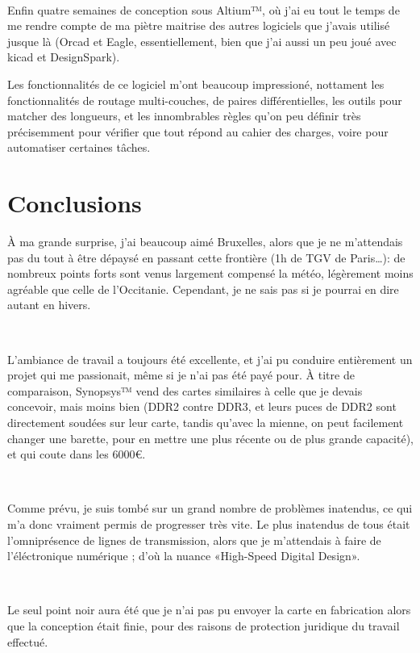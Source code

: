 \documentclass{article}
\begin{document}
~

Enfin quatre semaines de conception sous Altium™, où j’ai eu tout le temps de me rendre compte de ma piètre maitrise des autres logiciels que j’avais utilisé jusque là (Orcad et Eagle, essentiellement, bien que j’ai aussi un peu joué avec kicad et DesignSpark).

Les fonctionnalités de ce logiciel m’ont beaucoup impressioné, nottament les fonctionnalités de routage multi-couches, de paires différentielles, les outils pour matcher des longueurs, et les innombrables règles qu’on peu définir très précisemment pour vérifier que tout répond au cahier des charges, voire pour automatiser certaines tâches.

\section{Conclusions}
À ma grande surprise, j’ai beaucoup aimé Bruxelles, alors que je ne m’attendais pas du tout à être dépaysé en passant cette frontière (1h de TGV de Paris…): de nombreux points forts sont venus largement compensé la météo, légèrement moins agréable que celle de l’Occitanie. Cependant, je ne sais pas si je pourrai en dire autant en hivers.

~

L’ambiance de travail a toujours été excellente, et j’ai pu conduire entièrement un projet qui me passionait, même si je n’ai pas été payé pour. À titre de comparaison, Synopsys™ vend des cartes similaires à celle que je devais concevoir, mais moins bien (DDR2 contre DDR3, et leurs puces de DDR2 sont directement soudées sur leur carte, tandis qu’avec la mienne, on peut facilement changer une barette, pour en mettre une plus récente ou de plus grande capacité), et qui coute dans les 6000€.

~

Comme prévu, je suis tombé sur un grand nombre de problèmes inatendus, ce qui m’a donc vraiment permis de progresser très vite. Le plus inatendus de tous était l’omniprésence de lignes de transmission, alors que je m’attendais à faire de l’éléctronique numérique ; d’où la nuance «High-Speed Digital Design».

~

Le seul point noir aura été que je n’ai pas pu envoyer la carte en fabrication alors que la conception était finie, pour des raisons de protection juridique du travail effectué.
\end{document}
